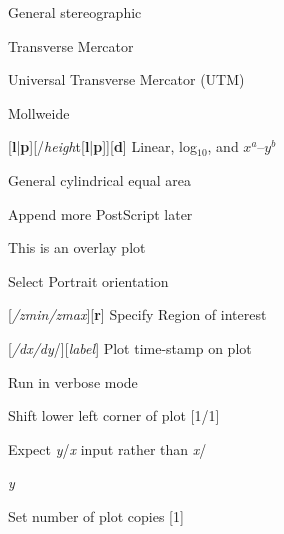 \documentclass{article}
\begin{document}
\par 	{}	General stereographic\par 

\par 	{}	Transverse Mercator\par 

\par 	{}	Universal Transverse Mercator (UTM)\par 

\par 	{}	Mollweide\par 

\par 	{}[{\bf l}|{\bf p}][/{\it heigh}t[{\bf l}|{\bf p}]][{\bf d}]	Linear, log$_{10}$, and $x^a$--$y^b$\par 

\par 	{}	General cylindrical equal area\par 

\par {}	Append more PostScript later\par 

\par {}	This is an overlay plot\par 

\par {}	Select Portrait orientation\par 

\par {}[{\it /zmin/zmax}][{\bf r}]	Specify Region of interest\par 

\par {}[{\it /dx/dy}/][{\it label}]	Plot time-stamp on plot\par 

\par {}	Run in verbose mode\par 

\par {} 	Shift lower left corner of plot [1/1]\par 

\par \Opt{:}	Expect {\it y}/{\it x} input rather than {\it x}/{\it y\par 

}\par {}	Set number of plot copies [1]\par 
\end{document}
